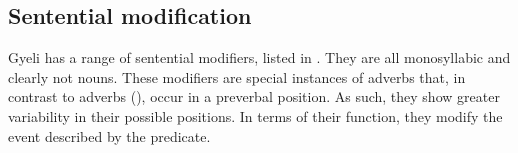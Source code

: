 


















\subsection{Sentential modification}
\label{sec:SentMod}

Gyeli has a range of sentential modifiers, listed in . They are all monosyllabic and clearly not nouns. These modifiers are special instances of adverbs that, in contrast to adverbs (), occur in a preverbal position. As such, they show greater variability in their possible positions. In terms of their function, they modify the event described by the predicate.


